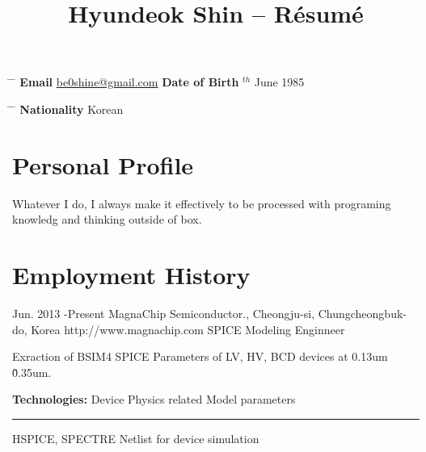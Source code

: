 \documentclass[10pt]{article} %
\begin{document}
\title{Hyundeok Shin -- Résumé} %
\parbox{1.1\textwidth}{ %
\begin{tabbing} %
\hspace*{1.2cm} \= \hspace*{7.5cm} \= \kill %
{\bf Email} \> \href{mailto:be0shine@gmail.com}{be0shine@gmail.com}
\hspace{2.0cm} {\bf Date of Birth} $^{th}$ June 1985\\
\end{tabbing}}
\hfill %
\parbox{0.5\textwidth}{ %
\begin{tabbing} %
\hspace{2cm} \= \hspace{1cm} \= \kill %
{\bf Nationality} \> Korean \\ 
\end{tabbing}}
\vspace{-1.5em}
\section{Personal Profile}
 Whatever I do, I always make it effectively to be processed with programing
 knowledg and thinking outside of box. 

\vspace{-1.0em}
\section{Employment History}

\job
{Jun. 2013 -}{Present}
{MagnaChip Semiconductor., Cheongju-si, Chungcheongbuk-do, Korea}
{http://www.magnachip.com}
{SPICE Modeling Enginneer}
{Exraction of BSIM4 SPICE Parameters of LV, HV, BCD devices at 0.13um \~ 0.35um.\\
\rule{0mm}{5mm}
\textbf{Technologies:} Device Physics related Model parameters \\
\rule{2.3cm}{0mm} HSPICE, SPECTRE  Netlist for device simulation
}
\end{document}
